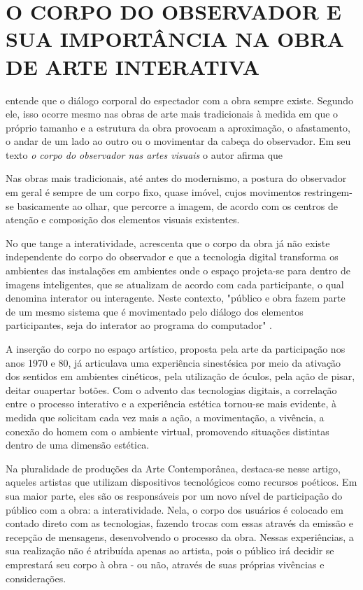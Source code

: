 \section{O CORPO DO OBSERVADOR E SUA IMPORTÂNCIA NA OBRA DE ARTE INTERATIVA}
	
 entende que o diálogo corporal do espectador com a obra sempre existe. Segundo ele, isso ocorre mesmo nas obras de arte mais tradicionais à medida em que o próprio tamanho e a estrutura da obra provocam a aproximação, o afastamento, o andar de um lado ao outro ou o movimentar da cabeça do observador. Em seu texto \textit{o corpo do observador nas artes visuais} o autor afirma que

\begin{citacao}
Nas obras mais tradicionais, até antes do modernismo, a postura do observador em geral é sempre de um corpo fixo, quase imóvel, cujos movimentos restringem-se basicamente ao olhar, que percorre a imagem, de acordo com os centros de atenção e composição dos elementos visuais existentes. \cite{sogabe} 
\end{citacao}

No que tange a interatividade, acrescenta que o corpo da obra já não existe independente do corpo do observador e que a tecnologia digital transforma os ambientes das instalações em ambientes onde o espaço projeta-se para dentro de imagens inteligentes, que se atualizam de acordo com cada participante, o qual denomina interator ou interagente. Neste contexto, "público e obra fazem parte de um mesmo sistema que é movimentado pelo diálogo dos elementos participantes, seja do interator ao programa do computador" .


A inserção do corpo no espaço artístico, proposta pela arte da participação nos
anos 1970 e 80, já articulava uma experiência sinestésica por meio da ativação dos
sentidos em ambientes cinéticos, pela utilização de óculos, pela ação de pisar, deitar ouapertar botões. Com o advento das tecnologias digitais, a correlação entre o processo
interativo e a experiência estética tornou-se mais evidente, à medida que solicitam cada
vez mais a ação, a movimentação, a vivência, a conexão do homem com o ambiente
virtual, promovendo situações distintas dentro de uma dimensão estética. \cite{rabello}



Na pluralidade de produções da Arte Contemporânea, destaca-se nesse artigo, aqueles artistas que utilizam dispositivos tecnológicos como recursos poéticos. Em sua maior parte, eles são os responsáveis por um novo nível de participação do público com a obra: a interatividade. Nela, o corpo dos usuários é colocado em contado direto com as tecnologias, fazendo trocas com essas através da emissão e recepção de mensagens, desenvolvendo o processo da obra. Nessas experiências, a sua realização não é atribuída apenas ao artista, pois o público irá decidir se emprestará seu corpo à obra - ou não, através de suas próprias vivências e considerações. \cite{vares}


